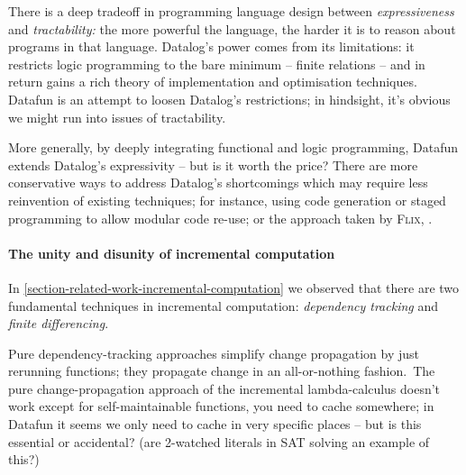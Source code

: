 There is a deep tradeoff in programming language design between \emph{expressiveness} and \emph{tractability:} the more powerful the language, the harder it is to reason about programs in that language.
%
Datalog's power comes from its limitations: it restricts logic programming to the bare minimum -- finite relations -- and in return gains a rich theory of implementation and optimisation techniques. Datafun is an attempt to loosen Datalog's restrictions; in hindsight, it's obvious we might run into issues of tractability.


More generally, by deeply integrating functional and logic programming, Datafun
extends Datalog's expressivity -- but is it worth the price? There are more
conservative ways to address Datalog's shortcomings which may require less
reinvention of existing techniques; for instance, using code generation or staged programming to allow modular code re-use; or the approach taken by \textsc{Flix}, \XXX.


\paragraph{The unity and disunity of incremental computation}


In \cref{section-related-work-incremental-computation} we observed that there are two fundamental techniques in incremental computation: \emph{dependency tracking} and \emph{finite differencing}. \XXX

Pure dependency-tracking approaches simplify change propagation by just rerunning functions; they propagate change in an all-or-nothing fashion.\footnotemark\ The pure change-propagation approach of the incremental lambda-calculus doesn't work except for self-maintainable functions, you need to cache somewhere; in Datafun it seems we only need to cache in very specific places -- but is this essential or accidental? (are 2-watched literals in SAT solving an example of this?)

